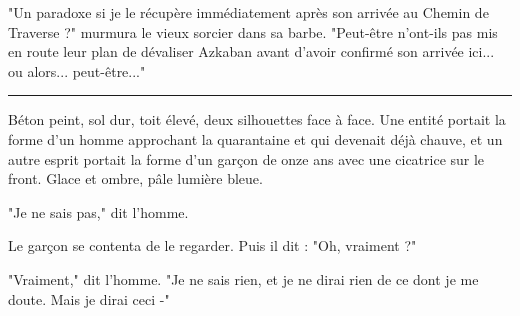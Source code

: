 "Un paradoxe si je le récupère immédiatement après son arrivée au Chemin de Traverse ?" murmura le vieux sorcier dans sa barbe. "Peut-être n'ont-ils pas mis en route leur plan de dévaliser Azkaban avant d'avoir confirmé son arrivée ici... ou alors... peut-être..."
\par\noindent\rule{\textwidth}{0.4pt}
Béton peint, sol dur, toit élevé, deux silhouettes face à face. Une entité portait la forme d'un homme approchant la quarantaine et qui devenait déjà chauve, et un autre esprit portait la forme d'un garçon de onze ans avec une cicatrice sur le front. Glace et ombre, pâle lumière bleue.

"Je ne sais pas," dit l'homme.

Le garçon se contenta de le regarder. Puis il dit : "Oh, vraiment ?"

"Vraiment," dit l'homme. "Je ne sais rien, et je ne dirai rien de ce dont je me doute. Mais je dirai ceci -"

